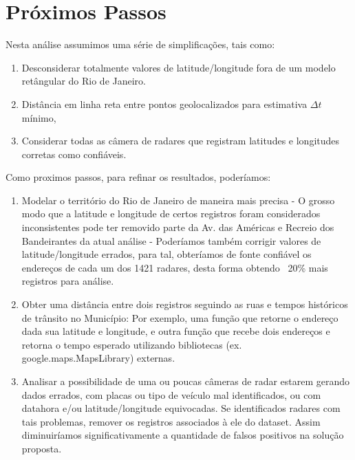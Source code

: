 \documentclass{article}
\begin{document}
\section{Próximos Passos}

Nesta análise assumimos uma série de simplificações, tais como:
\begin{enumerate}
\item Desconsiderar totalmente valores de latitude/longitude fora de um modelo retângular do Rio de Janeiro.
\item Distância em linha reta entre pontos geolocalizados para estimativa $ \Delta t $ mínimo,
\item Considerar todas as câmera de radares que registram latitudes e longitudes corretas como confiáveis.
\end{enumerate}


Como proximos passos, para refinar os resultados, poderíamos:
\begin{enumerate}
\item Modelar o território do Rio de Janeiro de maneira mais precisa - O grosso modo que a latitude e longitude de certos registros foram considerados inconsistentes pode ter removido parte da Av. das Américas e Recreio dos Bandeirantes da atual análise - Poderíamos também corrigir valores de latitude/longitude errados, para tal, obteríamos de fonte confiável os endereços de cada um dos 1421 radares, desta forma obtendo ~20\% mais registros para análise.
\item Obter uma distância entre dois registros seguindo as ruas e tempos históricos de trânsito no Município: Por exemplo, uma função que retorne o endereço dada sua latitude e longitude, e outra função que recebe dois endereços e retorna o tempo esperado utilizando bibliotecas (ex. google.maps.MapsLibrary) externas.
\item Analisar a possibilidade de uma ou poucas câmeras de radar estarem gerando dados errados, com placas ou tipo de veículo mal identificados, ou com datahora e/ou latitude/longitude equivocadas. Se identificados radares com tais problemas, remover os registros associados à ele do dataset. Assim diminuiríamos significativamente a quantidade de falsos positivos na solução proposta.
\end{enumerate}
\end{document}
